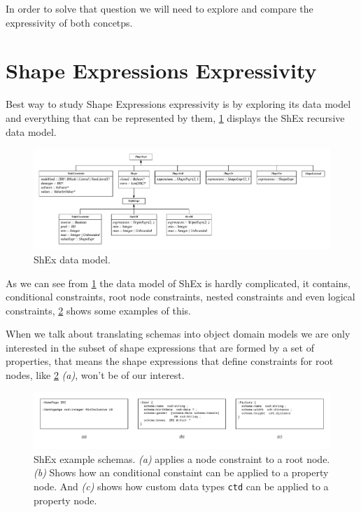 In order to solve that question we will need to explore and compare the expressivity of both concetps. 


\section{Shape Expressions Expressivity}
Best way to study Shape Expressions expressivity is by exploring its data model and everything that can be represented
by them, \cref{fig:shex-data-model} displays the ShEx recursive data model.

\begin{figure}
    \includegraphics[width=\textwidth]{images/shape-expr-data-model.pdf}
    \centering
    \caption[ShEx data model.]{ShEx data model.}
    \label{fig:shex-data-model}
\end{figure}

As we can see from \cref{fig:shex-data-model} the data model of ShEx is hardly complicated, it contains,
conditional constraints, root node constraints, nested constraints and even logical constraints,
\cref{fig:shex-example-schemas} shows some examples of this.

When we talk about translating schemas into object domain models we are only interested in the subset of
shape expressions that are formed by a set of properties, that means the shape expressions that define constraints
for root nodes, like \cref{fig:shex-example-schemas} \textit{(a)}, won't be of our interest.

\begin{figure}
    \includegraphics[width=\textwidth]{images/shex-different-expressions.pdf}
    \centering
    \caption[ShEx example schemas.]{ShEx example schemas. \textit{(a)} applies a node constraint to a root node.
    \textit{(b)} Shows how an conditional constaint can be applied to a property node. And \textit{(c)} shows how
    custom data types \texttt{ctd} can be applied to a property node.}
    \label{fig:shex-example-schemas}
\end{figure}

